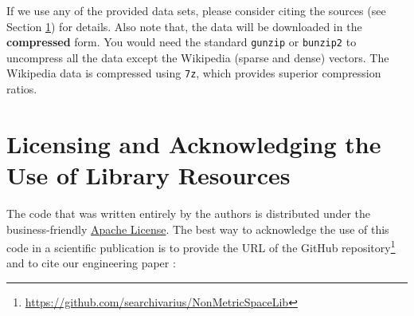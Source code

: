 \documentclass[runningheads,a4paper]{llncs}
\newcommand{\replocfile}{https://github.com/searchivarius/NonMetricSpaceLib/blob/pserv/}
\newcommand{\ttt}[1]{\texttt{#1}}
\begin{document}



If we use any of the provided data sets, please consider citing the sources (see Section \ref{SectionCredits}) for details.
Also note that, the data will be downloaded in the \textbf{compressed} form.
You would need the standard \ttt{gunzip} or \ttt{bunzip2} to uncompress all the data except
the Wikipedia (sparse and dense) vectors.
The Wikipedia data is compressed using \ttt{7z}, which provides 
superior compression ratios.

\section{Licensing and Acknowledging the Use of Library Resources}\label{SectionCredits}
The code that was written entirely by the authors is distributed 
under the business-friendly \href{http://apache.org/licenses/LICENSE-2.0}{Apache License}. 
The best way to acknowledge the use of this code 
in a scientific publication is to 
provide the URL of the GitHub repository\footnote{\url{https://github.com/searchivarius/NonMetricSpaceLib}} 
and to cite our engineering paper \cite{Boytsov_and_Bilegsaikhan:sisap2013}:
\end{document}
